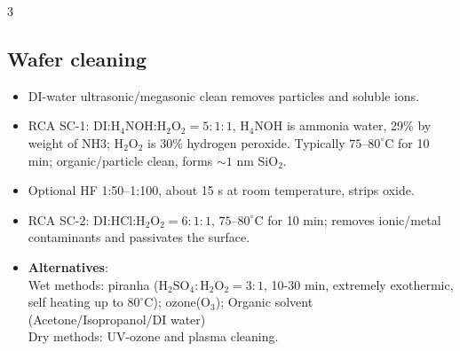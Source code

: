 \documentclass[10pt,a4paper]{ctexart}
\newcommand{\key}[1]{\textbf{#1}}
\begin{document}
\begin{multicols*}{3}
\subsection{Wafer cleaning}
\begin{itemize}
  \item DI-water ultrasonic/megasonic clean removes particles and soluble ions.
  \item RCA SC-1: DI:H$_4$NOH:H$_2$O$_2=5:1:1$, H$_4$NOH is ammonia water, 29\% by weight of NH3; 
  H$_2$O$_2$ is 30\% hydrogen peroxide. Typically $75$--$80^\circ$C for 10 min; 
  organic/particle clean, forms $\sim1$ nm SiO$_2$.
  \item Optional HF 1:50--1:100, about 15 s at room temperature, strips oxide.
  \item RCA SC-2: DI:HCl:H$_2$O$_2=6:1:1$, $75$--$80^\circ$C for 10 min;
  removes ionic/metal contaminants and passivates the surface.
\end{itemize}
\begin{itemize}
  \item \key{Alternatives}: \\
  Wet methods: piranha ($\mathrm{H_2SO_4:H_2O_2=3:1}$, 10-30 min, extremely exothermic, self heating up to $80^\circ$C); 
  ozone($\mathrm{O_3}$); Organic solvent (Acetone/Isopropanol/DI water)\\
  Dry methods: UV-ozone and plasma cleaning.
\end{itemize}


\end{multicols*}
\end{document}
